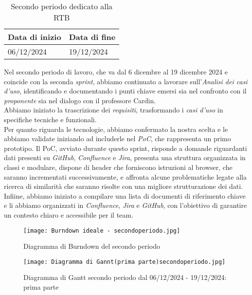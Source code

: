 \newpage
{}
\begin{table}[h!]
    \centering
    \renewcommand{\arraystretch}{1.5} %
    \begin{tabularx}{\textwidth}{|X|X|}\hline
    \rowcolor[HTML]{FFD700} 
    \textbf{Data di inizio} & \textbf{Data di fine} \\ \hline
    06/12/2024 & 19/12/2024 \\ \hline
    \end{tabularx}
    \caption{Secondo periodo dedicato alla RTB}
\end{table}
Nel secondo periodo di lavoro, che va dal 6 dicembre al 19 dicembre 2024 e coincide con la seconda \textit{sprint}, abbiamo continuato a lavorare sull’\emph{Analisi dei casi d’uso}, identificando e documentando i punti chiave emersi sia nel confronto con il \emph{proponente} sia nel dialogo con il professore Cardin.\\
Abbiamo iniziato la trascrizione dei \emph{requisiti}, trasformando i \emph{casi d’uso} in specifiche tecniche e funzionali.\\
Per quanto riguarda le tecnologie, abbiamo confermato la nostra scelta e le abbiamo validate iniziando ad includerle nel \emph{PoC}, che rappresenta un primo prototipo. Il PoC, avviato durante questo sprint, risponde a domande riguardanti dati presenti su \emph{GitHub}, \emph{Confluence} e \emph{Jira}, presenta una struttura organizzata in classi e modulare, dispone di header che forniscono istruzioni al browser, che saranno incrementati successivamente, e affronta alcune problematiche legate alla ricerca di similarità che saranno risolte con una migliore strutturazione dei dati. \\
Infiine, abbiamo iniziato a compilare una lista di documenti di riferimento chiave e li abbiamo organizzati in \emph{Confluence}, \emph{Jira} e \emph{GitHub}, con l’obiettivo di garantire un contesto chiaro e accessibile per il team.

\newpage

\begin{figure}[h] 
    \centering
    \texttt{[image: Burndown ideale - secondoperiodo.jpg]}
    \caption{Diagramma di Burndown del secondo periodo} 
    \label{fig: Diagramma di Burndown del secondo periodo}
\end{figure}

\newpage

\begin{figure}[h] 
    \centering
    \texttt{[image: Diagramma di Gannt(prima parte)secondoperiodo.jpg]}
    \caption{Diagramma di Gantt secondo periodo dal 06/12/2024 - 19/12/2024: prima parte} 
    \label{fig: Diagramma di Gantt primo periodo dal 06/12/2024 - 19/12/2024: prima parte}
\end{figure}


